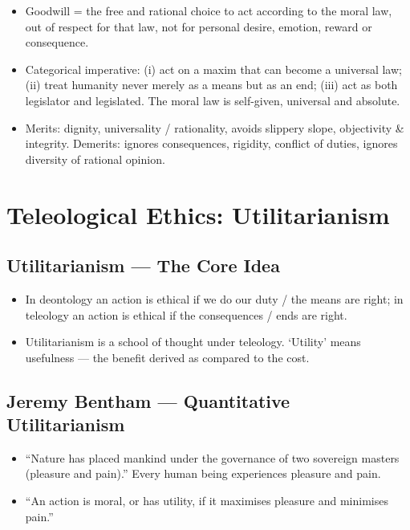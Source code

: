 \begin{QuickRevision}
\begin{itemize}
\item Goodwill = the free and rational choice to act according to the moral law, out of respect for that law, not for personal desire, emotion, reward or consequence.
\item Categorical imperative: (i) act on a maxim that can become a universal law; (ii) treat humanity never merely as a means but as an end; (iii) act as both legislator and legislated. The moral law is self-given, universal and absolute.
\item Merits: dignity, universality / rationality, avoids slippery slope, objectivity \& integrity. Demerits: ignores consequences, rigidity, conflict of duties, ignores diversity of rational opinion.
\end{itemize}
\end{QuickRevision}

\section{Teleological Ethics: Utilitarianism}

\subsection{Utilitarianism --- The Core Idea}

\begin{KeyConcept}
\begin{itemize}
\item In deontology an action is ethical if we do our duty / the means are right; in teleology an action is ethical if the consequences / ends are right.
\item Utilitarianism is a school of thought under teleology. `Utility' means usefulness --- the benefit derived as compared to the cost.
\end{itemize}
\end{KeyConcept}

\subsection{Jeremy Bentham --- Quantitative Utilitarianism}

\begin{KeyConcept}
\begin{itemize}
\item ``Nature has placed mankind under the governance of two sovereign masters (pleasure and pain).'' Every human being experiences pleasure and pain.
\item ``An action is moral, or has utility, if it maximises pleasure and minimises pain.''
\end{itemize}
\end{KeyConcept}

